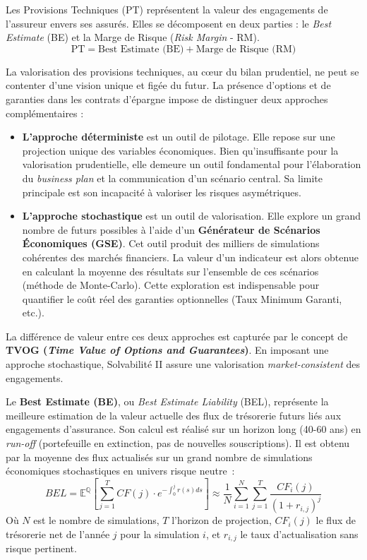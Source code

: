 Les Provisions Techniques (PT) représentent la valeur des engagements de l'assureur envers ses assurés. Elles se décomposent en deux parties : le \textit{Best Estimate} (BE) et la Marge de Risque (\textit{Risk Margin} - RM).
\begin{equation}
    \text{PT} = \text{Best Estimate (BE)} + \text{Marge de Risque (RM)}
\end{equation}

La valorisation des provisions techniques, au cœur du bilan prudentiel, ne peut se contenter d'une vision unique et figée du futur. La présence d'options et de garanties dans les contrats d'épargne impose de distinguer deux approches complémentaires :
\begin{itemize}
    \item \textbf{L'approche déterministe} est un outil de pilotage. Elle repose sur une projection unique des variables économiques. Bien qu'insuffisante pour la valorisation prudentielle, elle demeure un outil fondamental pour l'élaboration du \textit{business plan} et la communication d'un scénario central. Sa limite principale est son incapacité à valoriser les risques asymétriques.

    \item \textbf{L'approche stochastique} est un outil de valorisation. Elle explore un grand nombre de futurs possibles à l'aide d'un \textbf{Générateur de Scénarios Économiques (GSE)}. Cet outil produit des milliers de simulations cohérentes des marchés financiers. La valeur d'un indicateur est alors obtenue en calculant la moyenne des résultats sur l'ensemble de ces scénarios (méthode de Monte-Carlo). Cette exploration est indispensable pour quantifier le coût réel des garanties optionnelles (Taux Minimum Garanti, etc.).
\end{itemize}
La différence de valeur entre ces deux approches est capturée par le concept de \textbf{TVOG (\textit{Time Value of Options and Guarantees})}. En imposant une approche stochastique, Solvabilité II assure une valorisation \textit{market-consistent} des engagements.

Le \textbf{Best Estimate (BE)}, ou \textit{Best Estimate Liability} (BEL), représente la meilleure estimation de la valeur actuelle des flux de trésorerie futurs liés aux engagements d'assurance. Son calcul est réalisé sur un horizon long (40-60 ans) en \textit{run-off} (portefeuille en extinction, pas de nouvelles souscriptions). Il est obtenu par la moyenne des flux actualisés sur un grand nombre de simulations économiques stochastiques en univers risque neutre~:
\begin{equation}
    BEL = \mathbb{E}^{\mathbb{Q}} \left[ \sum_{j=1}^{T} CF(j) \cdot e^{-\int_0^j r(s)ds} \right] \approx \frac{1}{N}\sum_{i=1}^{N}\sum_{j=1}^{T}\frac{CF_{i}(j)}{(1+r_{i,j})^{j}}
\end{equation}
Où $N$ est le nombre de simulations, $T$ l'horizon de projection, $CF_{i}(j)$ le flux de trésorerie net de l'année $j$ pour la simulation $i$, et $r_{i,j}$ le taux d'actualisation sans risque pertinent.

